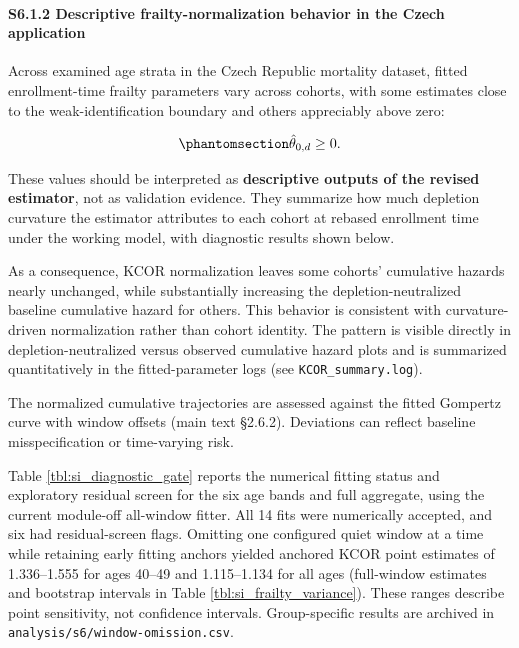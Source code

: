 \documentclass[
]{article}
\begin{document}
\paragraph{S6.1.2 Descriptive frailty-normalization behavior in the Czech application}\label{s6.1.2-descriptive-frailty-normalization-behavior-in-the-czech-application}

Across examined age strata in the Czech Republic mortality dataset, fitted enrollment-time frailty parameters vary across cohorts, with some estimates close to the weak-identification boundary and others appreciably above zero:

\begin{equation}\protect\phantomsection\label{eq:si_theta_near_zero}{\hat{\theta}_{0,d} \ge 0.}\end{equation}

These values should be interpreted as \textbf{descriptive outputs of the revised estimator}, not as validation evidence. They summarize how much depletion curvature the estimator attributes to each cohort at rebased enrollment time under the working model, with diagnostic results shown below.

As a consequence, KCOR normalization leaves some cohorts' cumulative hazards nearly unchanged, while substantially increasing the depletion-neutralized baseline cumulative hazard for others. This behavior is consistent with curvature-driven normalization rather than cohort identity. The pattern is visible directly in depletion-neutralized versus observed cumulative hazard plots and is summarized quantitatively in the fitted-parameter logs (see \texttt{KCOR\_summary.log}).

The normalized cumulative trajectories are assessed against the fitted Gompertz curve with window offsets (main text §2.6.2). Deviations can reflect baseline misspecification or time-varying risk.

Table \ref{tbl:si_diagnostic_gate} reports the numerical fitting status and exploratory residual screen for the six age bands and full aggregate, using the current module-off all-window fitter. All 14 fits were numerically accepted, and six had residual-screen flags. Omitting one configured quiet window at a time while retaining early fitting anchors yielded anchored KCOR point estimates of 1.336--1.555 for ages 40--49 and 1.115--1.134 for all ages (full-window estimates and bootstrap intervals in Table \ref{tbl:si_frailty_variance}). These ranges describe point sensitivity, not confidence intervals. Group-specific results are archived in \texttt{analysis/s6/window-omission.csv}.
\end{document}
